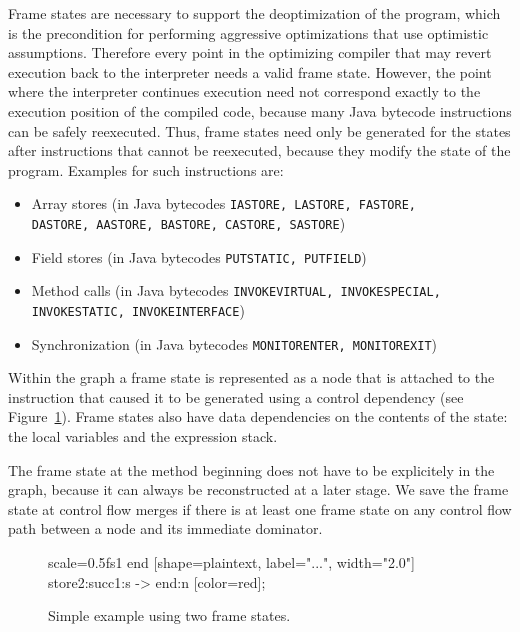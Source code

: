 \documentclass[twocolumn]{svjour3}
\begin{document}
Frame states are necessary to support the deoptimization of the program, which is the precondition for performing aggressive optimizations that use optimistic assumptions.
Therefore every point in the optimizing compiler that may revert execution back to the interpreter needs a valid frame state.
However, the point where the interpreter continues execution need not correspond exactly to the execution position of the compiled code, because many Java bytecode instructions can be safely reexecuted.
Thus, frame states need only be generated for the states after instructions that cannot be reexecuted, because they modify the state of the program.
Examples for such instructions are:

\begin{itemize}
    \item Array stores (in Java bytecodes {\tt IASTORE, LASTORE, FASTORE, \\DASTORE, AASTORE, BASTORE, CASTORE, SASTORE})
    \item Field stores (in Java bytecodes {\tt PUTSTATIC, PUTFIELD})
    \item Method calls (in Java bytecodes {\tt INVOKEVIRTUAL, INVOKESPECIAL, \\INVOKESTATIC, INVOKEINTERFACE})
    \item Synchronization (in Java bytecodes {\tt MONITORENTER, MONITOREXIT})
\end{itemize}

Within the graph a frame state is represented as a node that is attached to the instruction that caused it to be generated using a control dependency (see Figure~\ref{fig:fs1}).
Frame states also have data dependencies on the contents of the state: the local variables and the expression stack.

The frame state at the method beginning does not have to be explicitely in the graph, because it can always be reconstructed at a later stage.
We save the frame state at control flow merges if there is at least one frame state on any control flow path between a node and its immediate dominator.


\begin{figure}[ht]
  \centering
\begin{digraphenv}{scale=0.5}{fs1}
    end [shape=plaintext, label="...", width="2.0"]
    store2:succ1:s -> end:n [color=red];
\end{digraphenv}
  \caption{Simple example using two frame states.}
  \label{fig:fs1}
\end{figure}
\end{document}
